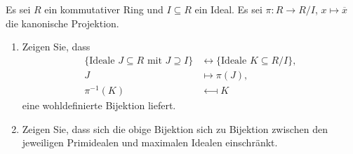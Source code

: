 \begin{question}
  \label{question: lattice isomorphism for quotients}
  Es sei $R$ ein kommutativer Ring und $I \subseteq R$ ein Ideal.
  Es sei $\pi \colon R \to R/I$, $x \mapsto \overline{x}$ die kanonische Projektion.
  \begin{enumerate}
    \item
      Zeigen Sie, dass
      \begin{align*}
                              \{ \text{Ideale $J \subseteq R$ mit $J \supseteq I$} \}
        &\longleftrightarrow  \{ \text{Ideale $K \subseteq R/I$} \},
        \\
                      J
        &\longmapsto  \pi(J),
        \\
                        \pi^{-1}(K)
        &\longmapsfrom  K
      \end{align*}
      eine wohldefinierte Bijektion liefert.
    \item
      Zeigen Sie, dass sich die obige Bijektion sich zu Bijektion zwischen den jeweiligen Primidealen und maximalen Idealen einschränkt.
  \end{enumerate}
\end{question}



